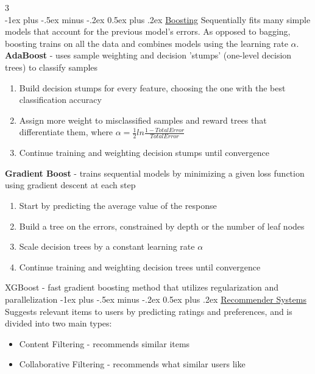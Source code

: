 \documentclass[10pt,landscape,letterpaper]{article}
\makeatletter
\renewcommand{\section}{\@startsection{section}{1}{0mm}%
                                {-1ex plus -.5ex minus -.2ex}%
                                {0.5ex plus .2ex}%
                                {\normalfont\large\bfseries}}
\makeatother
\begin{document}
\begin{multicols}{3}
\columnbreak
\textcolor{white}{.}\vspace{-3mm}\\ %
\section{\href{https://migue-rc.github.io/Data-Science-Cheatsheet/\#boosting}{Boosting}}
Sequentially fits many simple models that account for the previous model's errors. As opposed to bagging, boosting trains on all the data and combines models using the learning rate $\alpha$. \\
\smallskip
\textbf{AdaBoost} - uses sample weighting and decision 'stumps' (one-level decision trees) to classify samples
\begin{enumerate}[leftmargin=5mm]
\itemsep -.4mm
\item Build decision stumps for every feature, choosing the one with the best classification accuracy
\item Assign more weight to misclassified samples and reward trees that differentiate them, where  $\alpha = \frac{1}{2}ln\frac{1-TotalError}{TotalError}$
\item Continue training and weighting decision stumps until convergence
\end{enumerate}

\textbf{Gradient Boost} - trains sequential models by minimizing a given loss function using gradient descent at each step
\begin{enumerate}[leftmargin=5mm]
\itemsep -.4mm
\item Start by predicting the average value of the response
\item Build a tree on the errors, constrained by depth or the number of leaf nodes
\item Scale decision trees by a constant learning rate $\alpha$
\item Continue training and weighting decision trees until convergence
\end{enumerate}

XGBoost - fast gradient boosting method that utilizes regularization and parallelization
\section{\href{https://migue-rc.github.io/Data-Science-Cheatsheet/\#recommender-systems}{Recommender Systems}}
Suggests relevant items to users by predicting ratings and preferences, and is divided into two main types:
\begin{itemize}[label={--},leftmargin=4mm]
\itemsep -.4mm
\item Content Filtering - recommends similar items
\item Collaborative Filtering - recommends what similar users like
\end{itemize}


\end{multicols}
\end{document}
